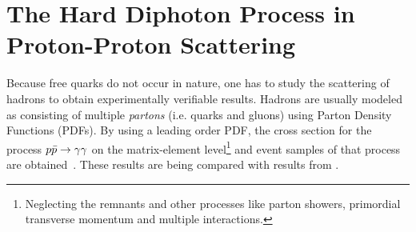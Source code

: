 \chapter{The Hard Diphoton Process in Proton-Proton
  Scattering}%
\label{chap:pdf}

Because free quarks do not occur in nature, one has to study the
scattering of hadrons to obtain experimentally verifiable
results. Hadrons are usually modeled as consisting of multiple
\emph{partons} (i.e. quarks and gluons) using Parton Density Functions
(PDFs). By using a leading order PDF, the cross section for the
process \(p\bar{p}\rightarrow\gamma\gamma\) on the matrix-element level\footnote{Neglecting the
  remnants and other processes like parton showers, primordial
  transverse momentum and multiple interactions.}  and event samples
of that process are obtained~\cite[14]{buckley:2011ge}. These results
are being compared with results from \sherpa.

